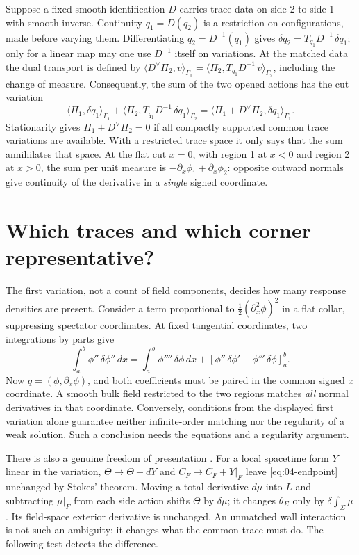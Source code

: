 Suppose a fixed smooth identification $D$ carries trace data on side 2 to
side 1 with smooth inverse. Continuity $q_1=D(q_2)$ is a restriction on
configurations, made before varying them. Differentiating $q_2=D^{-1}(q_1)$
gives $\delta q_2=T_{q_1}D^{-1}\,\delta q_1$; only for a linear map may one
use $D^{-1}$ itself on variations. At the matched data the dual transport is
defined by $\langle D^\vee\Pi_2,v\rangle_{\Gamma_1}
=\langle\Pi_2,T_{q_1}D^{-1}\,v\rangle_{\Gamma_2}$, including the change of
measure. Consequently, the sum of the two opened actions has the cut variation
\[
 \langle\Pi_1,\delta q_1\rangle_{\Gamma_1}
 +\langle\Pi_2,T_{q_1}D^{-1}\,\delta q_1\rangle_{\Gamma_2}
 =\langle\Pi_1+D^\vee\Pi_2,\delta q_1\rangle_{\Gamma_1}.
\]
Stationarity gives $\Pi_1+D^\vee\Pi_2=0$ if all compactly supported common
trace variations are available. With a restricted trace space it only says
that the sum annihilates that space. At the flat cut $x=0$, with region 1 at
$x<0$ and region 2 at $x>0$, the sum per unit measure is
$-\partial_x\phi_1+\partial_x\phi_2$: opposite outward normals give
continuity of the derivative in a \emph{single} signed coordinate.

\section{Which traces and which corner representative?}
The first variation, not a count of field components, decides how many
response densities are present. Consider a term proportional to
$\tfrac12(\partial_x^2\phi)^2$ in a flat collar, suppressing spectator
coordinates. At fixed tangential coordinates, two integrations by parts give
\[
 \int_a^b \phi''\,\delta\phi''\,dx
 =\int_a^b \phi''''\,\delta\phi\,dx
    +[\phi''\,\delta\phi'-\phi'''\,\delta\phi]_a^b.
\]
Now $q=(\phi,\partial_x\phi)$, and both coefficients must be paired in the
common signed $x$ coordinate. A smooth bulk field restricted to the two
regions matches \emph{all} normal derivatives in that coordinate. Conversely,
conditions from the displayed first variation alone guarantee neither
infinite-order matching nor the regularity of a weak solution. Such a
conclusion needs the equations and a regularity argument.

There is also a genuine freedom of presentation \cite{HW}. For a local
spacetime form $Y$ linear in the variation, $\Theta\mapsto\Theta+dY$ and
$C_F\mapsto C_F+Y|_F$ leave \eqref{eq:04-endpoint} unchanged by Stokes'
theorem. Moving a total derivative $d\mu$ into $L$ and subtracting $\mu|_F$
from each side action shifts $\Theta$ by $\delta\mu$; it changes
$\theta_\Sigma$ only by $\delta\int_\Sigma\mu$. Its field-space exterior
derivative is unchanged. An unmatched wall interaction is not such an
ambiguity: it changes what the common trace must do. The following test
detects the difference.

